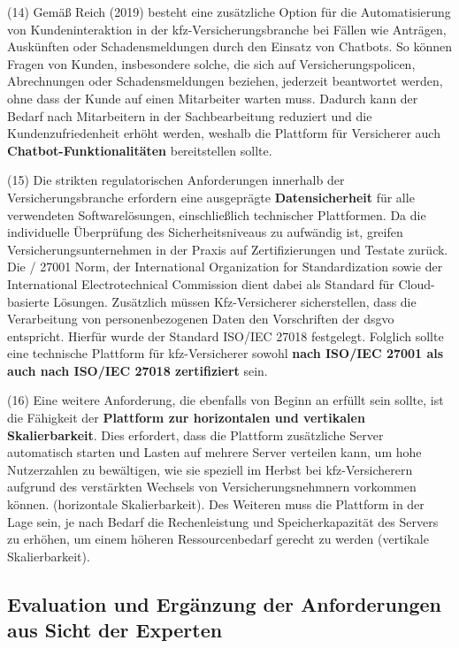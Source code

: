 (14) Gemäß Reich (2019) besteht eine zusätzliche Option für die Automatisierung von Kundeninteraktion in der \ac{kfz}-Versicherungsbranche bei Fällen wie Anträgen, Auskünften oder Schadensmeldungen durch den Einsatz von Chatbots. So können Fragen von Kunden, insbesondere solche, die sich auf Versicherungspolicen, Abrechnungen oder Schadensmeldungen beziehen, jederzeit beantwortet werden, ohne dass der Kunde auf einen Mitarbeiter warten muss. Dadurch kann der Bedarf nach Mitarbeitern in der Sachbearbeitung reduziert und die Kundenzufriedenheit erhöht werden, weshalb die Plattform für Versicherer auch \textbf{Chatbot-Funktionalitäten} bereitstellen sollte. \autocite[Vgl.][S. 300-302]{REICH2019}

(15) Die strikten regulatorischen Anforderungen innerhalb der Versicherungsbranche erfordern eine ausgeprägte \textbf{Datensicherheit} für alle verwendeten Softwarelösungen, einschließlich technischer Plattformen. Da die individuelle Überprüfung des Sicherheitsniveaus zu aufwändig ist, greifen Versicherungsunternehmen in der Praxis auf Zertifizierungen und Testate zurück. \autocite[Vgl.][S. 777]{ZDANOWIECKI2016} Die / 27001 Norm, der International Organization for Standardization sowie der International Electrotechnical Commission dient dabei als Standard für Cloud-basierte Lösungen. Zusätzlich müssen Kfz-Versicherer sicherstellen, dass die Verarbeitung von personenbezogenen Daten den Vorschriften der \ac{dsgvo} entspricht. Hierfür wurde der Standard ISO/IEC 27018 festgelegt. Folglich sollte eine technische Plattform für \ac{kfz}-Versicherer sowohl \textbf{nach ISO/IEC 27001 als auch nach ISO/IEC 27018 zertifiziert} sein. 

(16) Eine weitere Anforderung, die ebenfalls von Beginn an erfüllt sein sollte, ist die Fähigkeit der \textbf{Plattform zur horizontalen und vertikalen Skalierbarkeit}. Dies erfordert, dass die Plattform zusätzliche Server automatisch starten und Lasten auf mehrere Server verteilen kann, um hohe Nutzerzahlen zu bewältigen, wie sie speziell im Herbst bei \ac{kfz}-Versicherern aufgrund des verstärkten Wechsels von Versicherungsnehmnern vorkommen können. (horizontale Skalierbarkeit). Des Weiteren muss die Plattform in der Lage sein, je nach Bedarf die Rechenleistung und Speicherkapazität des Servers zu erhöhen, um einem höheren Ressourcenbedarf gerecht zu werden (vertikale Skalierbarkeit). \autocite[Vgl.][S. 23]{JAHNERT2020}

\newpage

\subsection{Evaluation und Ergänzung der Anforderungen aus Sicht der Experten}

